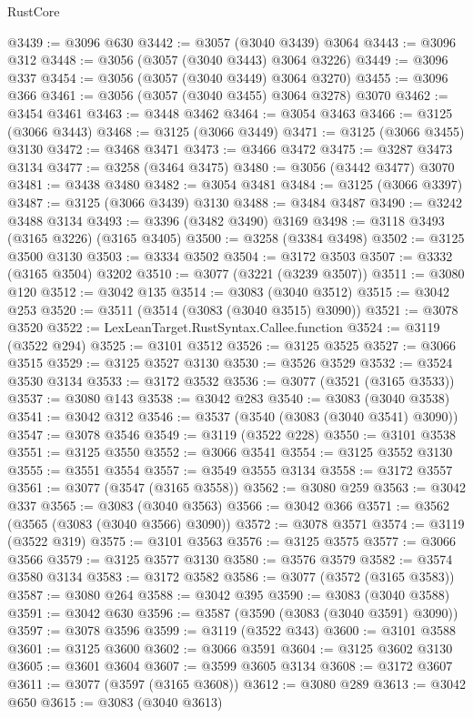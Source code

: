 \begin{lexlean}{RustCore}
\begin{coremodule}
@3439 := @3096 @630
@3442 := @3057 (@3040 @3439) @3064
@3443 := @3096 @312
@3448 := @3056 (@3057 (@3040 @3443) @3064 @3226)
@3449 := @3096 @337
@3454 := @3056 (@3057 (@3040 @3449) @3064 @3270)
@3455 := @3096 @366
@3461 := @3056 (@3057 (@3040 @3455) @3064 @3278) @3070
@3462 := @3454 @3461
@3463 := @3448 @3462
@3464 := @3054 @3463
@3466 := @3125 (@3066 @3443)
@3468 := @3125 (@3066 @3449)
@3471 := @3125 (@3066 @3455) @3130
@3472 := @3468 @3471
@3473 := @3466 @3472
@3475 := @3287 @3473 @3134
@3477 := @3258 (@3464 @3475)
@3480 := @3056 (@3442 @3477) @3070
@3481 := @3438 @3480
@3482 := @3054 @3481
@3484 := @3125 (@3066 @3397)
@3487 := @3125 (@3066 @3439) @3130
@3488 := @3484 @3487
@3490 := @3242 @3488 @3134
@3493 := @3396 (@3482 @3490) @3169
@3498 := @3118 @3493 (@3165 @3226) (@3165 @3405)
@3500 := @3258 (@3384 @3498)
@3502 := @3125 @3500 @3130
@3503 := @3334 @3502
@3504 := @3172 @3503
@3507 := @3332 (@3165 @3504) @3202
@3510 := @3077 (@3221 (@3239 @3507))
@3511 := @3080 @120
@3512 := @3042 @135
@3514 := @3083 (@3040 @3512)
@3515 := @3042 @253
@3520 := @3511 (@3514 (@3083 (@3040 @3515) @3090))
@3521 := @3078 @3520
@3522 := LexLeanTarget.RustSyntax.Callee.function
@3524 := @3119 (@3522 @294)
@3525 := @3101 @3512
@3526 := @3125 @3525
@3527 := @3066 @3515
@3529 := @3125 @3527 @3130
@3530 := @3526 @3529
@3532 := @3524 @3530 @3134
@3533 := @3172 @3532
@3536 := @3077 (@3521 (@3165 @3533))
@3537 := @3080 @143
@3538 := @3042 @283
@3540 := @3083 (@3040 @3538)
@3541 := @3042 @312
@3546 := @3537 (@3540 (@3083 (@3040 @3541) @3090))
@3547 := @3078 @3546
@3549 := @3119 (@3522 @228)
@3550 := @3101 @3538
@3551 := @3125 @3550
@3552 := @3066 @3541
@3554 := @3125 @3552 @3130
@3555 := @3551 @3554
@3557 := @3549 @3555 @3134
@3558 := @3172 @3557
@3561 := @3077 (@3547 (@3165 @3558))
@3562 := @3080 @259
@3563 := @3042 @337
@3565 := @3083 (@3040 @3563)
@3566 := @3042 @366
@3571 := @3562 (@3565 (@3083 (@3040 @3566) @3090))
@3572 := @3078 @3571
@3574 := @3119 (@3522 @319)
@3575 := @3101 @3563
@3576 := @3125 @3575
@3577 := @3066 @3566
@3579 := @3125 @3577 @3130
@3580 := @3576 @3579
@3582 := @3574 @3580 @3134
@3583 := @3172 @3582
@3586 := @3077 (@3572 (@3165 @3583))
@3587 := @3080 @264
@3588 := @3042 @395
@3590 := @3083 (@3040 @3588)
@3591 := @3042 @630
@3596 := @3587 (@3590 (@3083 (@3040 @3591) @3090))
@3597 := @3078 @3596
@3599 := @3119 (@3522 @343)
@3600 := @3101 @3588
@3601 := @3125 @3600
@3602 := @3066 @3591
@3604 := @3125 @3602 @3130
@3605 := @3601 @3604
@3607 := @3599 @3605 @3134
@3608 := @3172 @3607
@3611 := @3077 (@3597 (@3165 @3608))
@3612 := @3080 @289
@3613 := @3042 @650
@3615 := @3083 (@3040 @3613)

\end{coremodule}
\end{lexlean}
